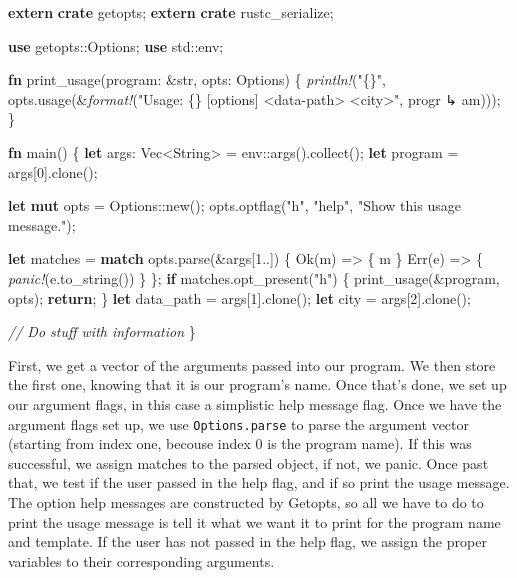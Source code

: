 \documentclass[a4paper,]{book}
\newenvironment{Shaded}{\begin{snugshade}}{\end{snugshade}}
\newcommand{\KeywordTok}[1]{\textcolor[rgb]{0.13,0.29,0.53}{\textbf{{#1}}}}
\newcommand{\DataTypeTok}[1]{\textcolor[rgb]{0.13,0.29,0.53}{{#1}}}
\newcommand{\DecValTok}[1]{\textcolor[rgb]{0.00,0.00,0.81}{{#1}}}
\newcommand{\ConstantTok}[1]{\textcolor[rgb]{0.00,0.00,0.00}{{#1}}}
\newcommand{\StringTok}[1]{\textcolor[rgb]{0.31,0.60,0.02}{{#1}}}
\newcommand{\CommentTok}[1]{\textcolor[rgb]{0.56,0.35,0.01}{\textit{{#1}}}}
\newcommand{\PreprocessorTok}[1]{\textcolor[rgb]{0.56,0.35,0.01}{\textit{{#1}}}}
\newcommand{\NormalTok}[1]{{#1}}
\begin{document}
\begin{Shaded}
\begin{Highlighting}[]
\KeywordTok{extern} \KeywordTok{crate} \NormalTok{getopts;}
\KeywordTok{extern} \KeywordTok{crate} \NormalTok{rustc_serialize;}

\KeywordTok{use} \NormalTok{getopts::Options;}
\KeywordTok{use} \NormalTok{std::env;}

\KeywordTok{fn} \NormalTok{print_usage(program: &}\DataTypeTok{str}\NormalTok{, opts: Options) \{}
    \PreprocessorTok{println!}\NormalTok{(}\StringTok{"\{\}"}\NormalTok{, opts.usage(&}\PreprocessorTok{format!}\NormalTok{(}\StringTok{"Usage: \{\} [options] <data-path> <city>"}\NormalTok{, progr}
\NormalTok{↳ am)));}
\NormalTok{\}}

\KeywordTok{fn} \NormalTok{main() \{}
    \KeywordTok{let} \NormalTok{args: }\DataTypeTok{Vec}\NormalTok{<}\DataTypeTok{String}\NormalTok{> = env::args().collect();}
    \KeywordTok{let} \NormalTok{program = args[}\DecValTok{0}\NormalTok{].clone();}

    \KeywordTok{let} \KeywordTok{mut} \NormalTok{opts = Options::new();}
    \NormalTok{opts.optflag(}\StringTok{"h"}\NormalTok{, }\StringTok{"help"}\NormalTok{, }\StringTok{"Show this usage message."}\NormalTok{);}
    
    \KeywordTok{let} \NormalTok{matches = }\KeywordTok{match} \NormalTok{opts.parse(&args[}\DecValTok{1.}\NormalTok{.]) \{}
        \ConstantTok{Ok}\NormalTok{(m)  => \{ m \}}
    \ConstantTok{Err}\NormalTok{(e) => \{ }\PreprocessorTok{panic!}\NormalTok{(e.to_string()) \}}
    \NormalTok{\};}
    \KeywordTok{if} \NormalTok{matches.opt_present(}\StringTok{"h"}\NormalTok{) \{}
        \NormalTok{print_usage(&program, opts);}
    \KeywordTok{return}\NormalTok{;}
    \NormalTok{\}}
    \KeywordTok{let} \NormalTok{data_path = args[}\DecValTok{1}\NormalTok{].clone();}
    \KeywordTok{let} \NormalTok{city = args[}\DecValTok{2}\NormalTok{].clone();}
    
    \CommentTok{// Do stuff with information}
\NormalTok{\}}
\end{Highlighting}
\end{Shaded}

First, we get a vector of the arguments passed into our program. We then
store the first one, knowing that it is our program's name. Once that's
done, we set up our argument flags, in this case a simplistic help
message flag. Once we have the argument flags set up, we use
\texttt{Options.parse} to parse the argument vector (starting from index
one, becouse index 0 is the program name). If this was successful, we
assign matches to the parsed object, if not, we panic. Once past that,
we test if the user passed in the help flag, and if so print the usage
message. The option help messages are constructed by Getopts, so all we
have to do to print the usage message is tell it what we want it to
print for the program name and template. If the user has not passed in
the help flag, we assign the proper variables to their corresponding
arguments.
\end{document}
